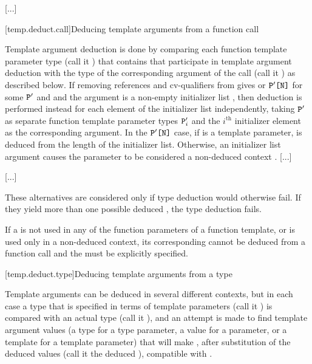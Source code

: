 \documentclass{wg21}
\begin{document}
\textcolor{noteclr}{[...]}

[temp.deduct.call]{Deducing template arguments from a function call}

\pnum
Template argument deduction is done by comparing each function
template parameter type (call it
)
that contains  that participate in template argument deduction
with the type of the corresponding argument of the call (call it
)
as described below.
If removing references and cv-qualifiers from  gives
or $\texttt{P}'\texttt{[N]}$
for some $\texttt{P}'$ and  and the
argument is a non-empty initializer list , then deduction is
performed instead for each element of the initializer list independently,
taking $\texttt{P}'$
as separate function template parameter types $\texttt{P}'_i$
and the $i^\text{th}$ initializer element as the corresponding argument.
In the $\texttt{P}'\texttt{[N]}$ case, if  is a  template parameter,
 is deduced from the length of the initializer list.
Otherwise, an initializer list argument causes the
parameter to be considered a non-deduced context .
\textcolor{noteclr}{[...]}

\textcolor{noteclr}{[...]}

\pnum
These alternatives are considered only if type deduction would
otherwise fail.
If they yield more than one possible deduced
,
the type deduction fails.
\begin{note}
If a
is not used in any of the function parameters of a function template,
or is used only in a non-deduced context, its corresponding
cannot be deduced from a function call and the
must be explicitly specified.
\end{note}

[temp.deduct.type]{Deducing template arguments from a type}

\pnum
Template arguments can be deduced in several different contexts, but
in each case a type that is specified in terms of template parameters
(call it
)
is compared with an actual type (call it
),
and an attempt is made to find template argument values (a type for a type
parameter, a value for a  parameter, or a template for a
template parameter) that will make
,
after substitution of the deduced values (call it the deduced
),
compatible with
.
\end{document}
